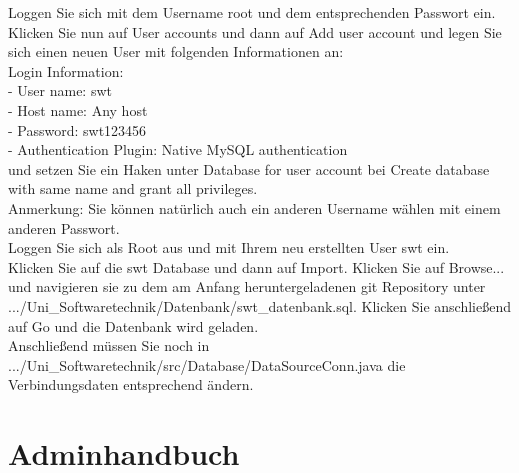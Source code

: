 \documentclass{Handbuch}
\begin{document}
Loggen Sie sich mit dem Username root und dem entsprechenden Passwort ein.\\
Klicken Sie nun auf \frqq User accounts\flqq{} und dann auf \frqq Add user account\flqq{} und legen Sie sich einen neuen User mit folgenden Informationen an:\\

Login Information:\\
- User name: swt\\
- Host name: Any host\\
- Password: swt123456\\
- Authentication Plugin: Native MySQL authentication\\

und setzen Sie ein Haken unter \frqq Database for user account\flqq{} bei \frqq Create database with same name and grant all privileges\flqq.\\

Anmerkung: Sie können natürlich auch ein anderen Username wählen mit einem anderen Passwort.\\

Loggen Sie sich als Root aus und mit Ihrem neu erstellten User swt ein.\\
Klicken Sie auf die swt Database und dann auf \frqq Import\flqq. Klicken Sie auf \frqq Browse...\flqq{} und navigieren sie zu dem am Anfang heruntergeladenen git Repository unter .../Uni\_Softwaretechnik/Datenbank/swt\_datenbank.sql. Klicken Sie anschließend auf \frqq Go\flqq{} und die Datenbank wird geladen.\\

Anschließend müssen Sie noch in .../Uni\_Softwaretechnik/src/Database/DataSourceConn.java die Verbindungsdaten entsprechend ändern.



\newpage
\section{Adminhandbuch}
\end{document}
